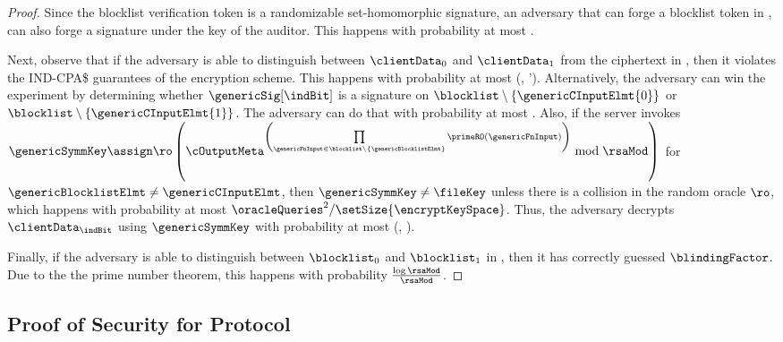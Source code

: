\begin{proof}
Since the blocklist verification token is a randomizable set-homomorphic signature, an adversary that can forge a blocklist token in \unforgeBlocklistExp, can also forge a signature under the key of the auditor. This happens with probability at most \ufcmaAdv. 

Next, observe that if the adversary is able to distinguish between $\clientData_0$ and $\clientData_1$ from the ciphertext \cOutputFile in \hidingContentExp, then it violates the IND-CPA\$ guarantees of the encryption scheme. This happens with probability at most  \Advantage{\indcpaRandLabel}{\encryptionSchemeDefn}(\timeBound, 
		\oracleQueries'). Alternatively, the adversary can win the experiment by determining whether $\genericSig[\indBit]$ is a signature on $\blocklist \setminus \{\genericCInputElmt{0} \} $ or $\blocklist \setminus \{\genericCInputElmt{1} \} $. The adversary can do that with probability at most \indsrAdv. Also, if the server invokes $\genericSymmKey \assign \ro\left(\cOutputMeta^{\left(\prod\limits_{\genericFnInput \in \blocklist \setminus \{\genericBlocklistElmt\}}\primeRO(\genericFnInput)\right)} \bmod \rsaMod \right)$ for $\genericBlocklistElmt \neq \genericCInputElmt$, then $\genericSymmKey \neq \fileKey$  unless there is a collision in the random oracle $\ro$, which happens with probability at most $\oracleQueries^{2}/\setSize{\encryptKeySpace}$. Thus, the adversary decrypts $\clientData_\indBit$ using $\genericSymmKey$ with probability at most \Advantage{\cciLabel}{\encryptionSchemeDefn}(\timeBound, \oracleQueries).


Finally, if the adversary is able to distinguish between $\blocklist_0$ and $\blocklist_1$ in \hidingBlocklistExp, then it has correctly guessed $\blindingFactor$. Due to the the prime number theorem, this happens with probability $\frac{\log \rsaMod}{\rsaMod}$.

\end{proof}



\subsection{Proof of Security for Protocol \protocolFM}
\label{sec:proof:fm}
%


